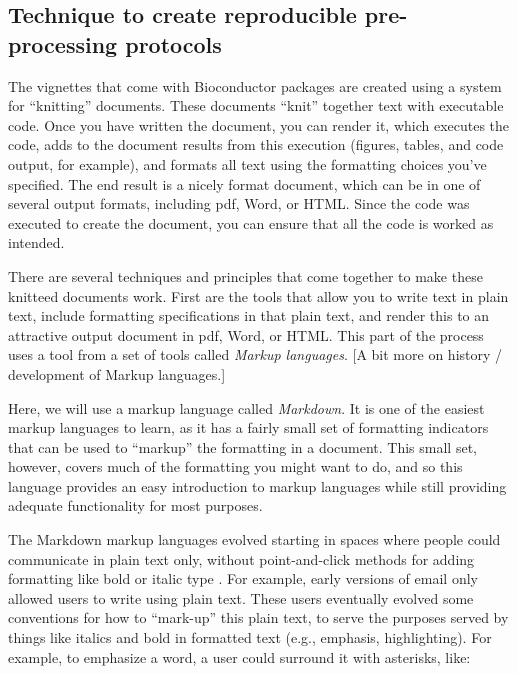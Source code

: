 \documentclass[]{tufte-book}
\begin{document}
\hypertarget{technique-to-create-reproducible-pre-processing-protocols}{%
\subsection{Technique to create reproducible pre-processing protocols}\label{technique-to-create-reproducible-pre-processing-protocols}}

The vignettes that come with Bioconductor packages are created using a system
for ``knitting'' documents. These documents ``knit'' together text with executable
code. Once you have written the document, you can render it, which executes the
code, adds to the document results from this execution (figures, tables, and
code output, for example), and formats all text using the formatting choices
you've specified. The end result is a nicely format document, which can be in
one of several output formats, including pdf, Word, or HTML. Since the code
was executed to create the document, you can ensure that all the code
is worked as intended.

There are several techniques and principles that come together to make these
knitteed documents work. First are the tools that allow you to write text
in plain text, include formatting specifications in that plain text, and
render this to an attractive output document in pdf, Word, or HTML. This
part of the process uses a tool from a set of tools called \emph{Markup languages}.
{[}A bit more on history / development of Markup languages.{]}

Here, we will use a markup language called \emph{Markdown}. It is one of the easiest
markup languages to learn, as it has a fairly small set of formatting indicators
that can be used to ``markup'' the formatting in a document. This small set,
however, covers much of the formatting you might want to do, and so this
language provides an easy introduction to markup languages while still providing
adequate functionality for most purposes.

The Markdown markup languages evolved starting in spaces where people could
communicate in plain text only, without point-and-click methods for adding
formatting like bold or italic type \citep{buffalo2015bioinformatics}. For example,
early versions of email only allowed users to write using plain text. These
users eventually evolved some conventions for how to ``mark-up'' this plain text,
to serve the purposes served by things like italics and bold in formatted text
(e.g., emphasis, highlighting). For example, to emphasize a word, a user could
surround it with asterisks, like:
\end{document}
